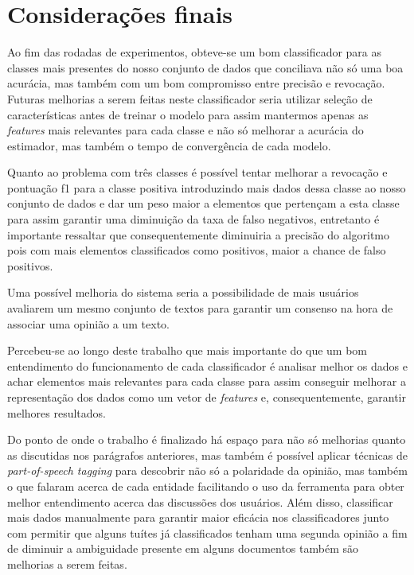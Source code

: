 \chapter{Considerações finais}

Ao fim das rodadas de experimentos, obteve-se um bom classificador
para as classes mais presentes do nosso conjunto de dados que conciliava
não só uma boa acurácia, mas também com um bom compromisso entre precisão e
revocação. Futuras melhorias a serem feitas neste classificador seria utilizar
seleção de características antes de treinar o modelo para assim mantermos apenas
as \textit{features} mais relevantes para cada classe e não só melhorar a acurácia
do estimador, mas também o tempo de convergência de cada modelo.

Quanto ao problema com três classes é possível tentar melhorar a revocação e pontuação
f1 para a classe positiva introduzindo mais dados dessa classe ao nosso conjunto de dados
e dar um peso maior a elementos que pertençam a esta classe para assim garantir uma diminuição
da taxa de falso negativos, entretanto é importante ressaltar que consequentemente diminuiria
a precisão do algoritmo pois com mais elementos classificados como positivos, maior a chance
de falso positivos.

Uma possível melhoria
do sistema seria a possibilidade de mais usuários avaliarem um mesmo conjunto de textos para
garantir um consenso na hora de associar uma opinião a um texto.

Percebeu-se ao longo deste trabalho que mais importante do que um bom entendimento
do funcionamento de cada classificador é analisar melhor os dados e achar elementos
mais relevantes para cada classe para assim conseguir melhorar a representação dos dados
como um vetor de \textit{features} e, consequentemente, garantir melhores resultados.

Do ponto de onde o trabalho é finalizado há espaço para não só melhorias quanto as discutidas
nos parágrafos anteriores, mas também é possível aplicar técnicas de \textit{part-of-speech tagging}
para descobrir não só a polaridade da opinião, mas também o que falaram acerca de cada entidade
facilitando o uso da ferramenta para obter melhor entendimento acerca das discussões dos usuários.
Além disso, classificar mais dados manualmente para garantir maior eficácia nos classificadores
junto com permitir que alguns tuítes já classificados tenham uma segunda opinião a fim de
diminuir a ambiguidade presente em alguns documentos também são melhorias a serem feitas.
